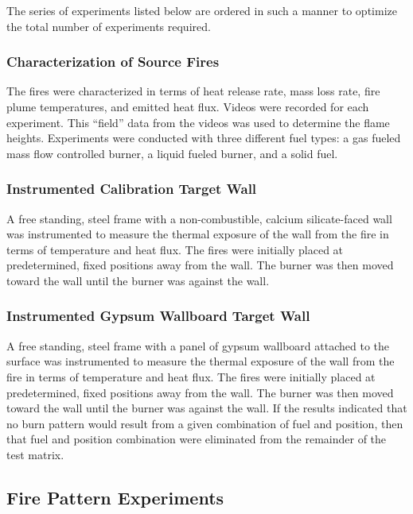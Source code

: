 \documentclass[twoside]{uocthesis}
\begin{document}
The series of experiments listed below are ordered in such a manner to optimize the total number of experiments required.

\subsubsection{Characterization of Source Fires}

The fires were characterized in terms of heat release rate, mass loss rate, fire plume temperatures, and emitted heat flux. Videos were recorded for each experiment.  This ``field'' data from the videos was  used to determine the flame heights. Experiments were conducted with three different fuel types: a gas fueled mass flow controlled burner, a liquid fueled burner, and a solid fuel.

\subsubsection{Instrumented Calibration Target Wall}

A free standing, steel frame with a non-combustible, calcium silicate-faced wall was instrumented to measure the thermal exposure of the wall from the fire in terms of temperature and heat flux.  The fires were initially placed at predetermined, fixed positions away from the wall. The burner was then moved toward the wall until the burner was against the wall.

\subsubsection{Instrumented Gypsum Wallboard Target Wall}

A free standing, steel frame with a panel of gypsum wallboard attached to the surface was instrumented to measure the thermal exposure of the wall from the fire in terms of temperature and heat flux.  The fires were initially placed at predetermined, fixed positions away from the wall. The burner was then moved toward the wall until the burner was against the wall.  If the results indicated that no burn pattern would result from a given combination of fuel and position, then that fuel and position combination were eliminated from the remainder of the test matrix.

\subsection{Fire Pattern Experiments}
\end{document}
